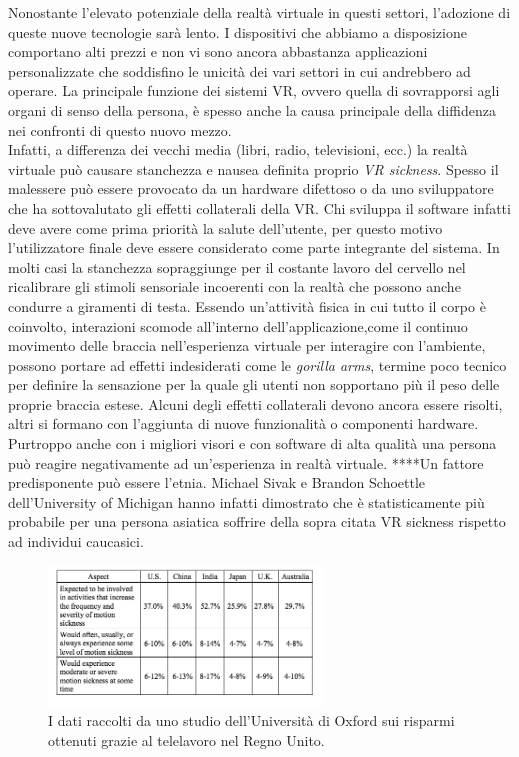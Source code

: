 Nonostante l'elevato potenziale della realtà virtuale in questi settori, l'adozione di queste nuove tecnologie sarà lento. I dispositivi che abbiamo a disposizione comportano alti prezzi e non vi sono ancora abbastanza applicazioni personalizzate che soddisfino le unicità dei vari settori in cui andrebbero ad operare. La principale funzione dei sistemi VR, ovvero quella di sovrapporsi agli organi di senso della persona, è spesso anche la causa principale della diffidenza nei confronti di questo nuovo mezzo. \\
Infatti, a differenza dei vecchi media (libri, radio, televisioni, ecc.) la realtà virtuale può causare stanchezza e nausea definita proprio \textit{VR sickness}. Spesso il malessere può essere provocato da un hardware difettoso o da uno sviluppatore che ha sottovalutato gli effetti collaterali della VR. Chi sviluppa il software infatti deve avere come prima priorità la salute dell'utente, per questo motivo l'utilizzatore finale deve essere considerato come parte integrante del sistema. In molti casi la stanchezza sopraggiunge per il costante lavoro del cervello nel ricalibrare gli stimoli sensoriale incoerenti con la realtà che possono anche condurre a giramenti di testa. Essendo un'attività fisica in cui tutto il corpo è coinvolto, interazioni scomode all'interno dell'applicazione,come  il continuo movimento delle braccia nell'esperienza virtuale per interagire con l'ambiente, possono portare ad effetti indesiderati come le \textit{gorilla arms}, termine poco tecnico per definire la sensazione per la quale gli utenti non sopportano più il peso delle proprie braccia estese. Alcuni degli effetti collaterali devono ancora essere risolti, altri si formano con l'aggiunta di nuove funzionalità o componenti hardware.\\
Purtroppo anche con i migliori visori e con software di alta qualità una persona può reagire negativamente ad un'esperienza in realtà virtuale. ****Un fattore predisponente può essere l'etnia. Michael Sivak e Brandon Schoettle dell'University of Michigan hanno infatti dimostrato che è statisticamente più probabile per una persona asiatica soffrire della sopra citata VR sickness rispetto ad individui caucasici.

\begin{figure}[H]
	\includegraphics[width=0.65\textwidth]{figure/motionsickenss2}
	\centering
	\caption{I dati raccolti da uno studio dell'Università di Oxford sui risparmi ottenuti grazie al telelavoro nel Regno Unito.}
\end{figure}

